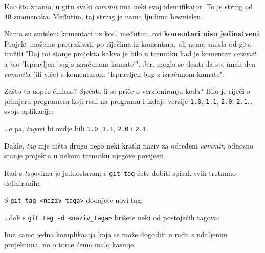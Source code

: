 Kao što znamo, u gitu svaki \emph{commit} ima neki svoj identifikator. 
To je string od 40 znamenaka.
Međutim, taj string je nama ljudima besmislen.

Nama su smisleni komentari uz kod, međutim, ovi \textbf{komentari nisu jedinstveni}.
Projekt možemo pretraživati po riječima iz komentara, ali nema smisla od gita tražiti "Daj mi stanje projekta kakvo je bilo u trenutku kad je komentar \emph{commit} a bio 'Ispravljen bug s izračunom kamate'".
Jer, moglo se desiti da ste imali dva \emph{commit}a (ili više) s komentarom "Ispravljen bug s izračunom kamate".

Zašto to uopće činimo?
Sjećate li se priče o verzioniranju koda?
Bilo je riječi o primjeru programera koji radi na programu i izdaje verzije \verb+1.0+, \verb+1.1+, \verb+2.0+, \verb+2.1+\dots svoje aplikacije:



\dots{}e pa, \emph{tag}ovi bi ovdje bili \verb+1.0+, \verb+1.1+, \verb+2.0+ i \verb+2.1+.

Dakle, \emph{tag} nije ništa drugo nego neki kratki naziv za određeni \emph{commit}, odnosno stanje projekta u nekom trenutku njegove povijesti.

Rad s \emph{tag}ovima je jednostavan; s \verb+git tag+ ćete dobiti spisak svih tretnuno definiranih:



S \verb+git tag <naziv_taga>+ dodajete novi tag:


\dots{}dok s \verb+git tag -d <naziv_taga>+ brišete neki od postojećih tagova:


Ima samo jedna komplikacija koja se može dogoditi u radu s udaljenim projektima, no o tome ćemo malo kasnije.
